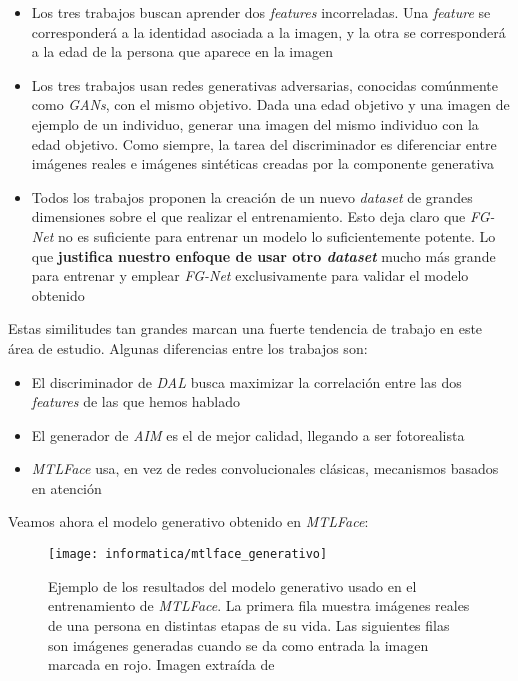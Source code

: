 \begin{itemize}
	\item Los tres trabajos buscan aprender dos \textit{features} incorreladas. Una \textit{feature} se corresponderá a la identidad asociada a la imagen, y la otra se corresponderá a la edad de la persona que aparece en la imagen
	\item Los tres trabajos usan redes generativas adversarias, conocidas comúnmente como \textit{GANs}, con el mismo objetivo. Dada una edad objetivo y una imagen de ejemplo de un individuo, generar una imagen del mismo individuo con la edad objetivo. Como siempre, la tarea del discriminador es diferenciar entre imágenes reales e imágenes sintéticas creadas por la componente generativa
	\item Todos los trabajos proponen la creación de un nuevo \textit{dataset} de grandes dimensiones sobre el que realizar el entrenamiento. Esto deja claro que \textit{FG-Net} no es suficiente para entrenar un modelo lo suficientemente potente. Lo que \textbf{justifica nuestro enfoque de usar otro \textit{dataset}} mucho más grande para entrenar y emplear \textit{FG-Net} exclusivamente para validar el modelo obtenido
\end{itemize}

Estas similitudes tan grandes marcan una fuerte tendencia de trabajo en este área de estudio. Algunas diferencias entre los trabajos son:

\begin{itemize}
	\item El discriminador de \textit{DAL} busca maximizar la correlación entre las dos \textit{features} de las que hemos hablado
	\item El generador de \textit{AIM} es el de mejor calidad, llegando a ser fotorealista
	\item \textit{MTLFace} usa, en vez de redes convolucionales clásicas, mecanismos basados en atención
\end{itemize}

Veamos ahora el modelo generativo obtenido en \textit{MTLFace}:

\begin{figure}[H]
	\centering
	\texttt{[image: informatica/mtlface\_generativo]}
	\caption{Ejemplo de los resultados del modelo generativo usado en el entrenamiento de \textit{MTLFace}. La primera fila muestra imágenes reales de una persona en distintas etapas de su vida. Las siguientes filas son imágenes generadas cuando se da como entrada la imagen marcada en rojo. Imagen extraída de \cite{informatica:best_fgnet_model}}
\end{figure}


